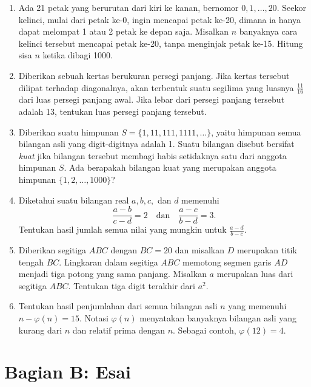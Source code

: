 \documentclass[11pt, a4paper]{article}
\begin{document}
\begin{enumerate}[label=\textbf{No. \arabic*}, leftmargin=*]
    \item Ada 21 petak yang berurutan dari kiri ke kanan, bernomor $0, 1, \dots, 20$. Seekor kelinci, mulai dari petak ke-0, ingin mencapai petak ke-20, dimana ia hanya dapat melompat 1 atau 2 petak ke depan saja. Misalkan $n$ banyaknya cara kelinci tersebut mencapai petak ke-20, tanpa menginjak petak ke-15. Hitung sisa $n$ ketika dibagi 1000.

    \item Diberikan sebuah kertas berukuran persegi panjang. Jika kertas tersebut dilipat terhadap diagonalnya, akan terbentuk suatu segilima yang luasnya $\frac{11}{16}$ dari luas persegi panjang awal. Jika lebar dari persegi panjang tersebut adalah 13, tentukan luas persegi panjang tersebut.

    \item Diberikan suatu himpunan $S = \{1, 11, 111, 1111, \dots\}$, yaitu himpunan semua bilangan asli yang digit-digitnya adalah 1. Suatu bilangan disebut bersifat \textit{kuat} jika bilangan tersebut membagi habis setidaknya satu dari anggota himpunan $S$. Ada berapakah bilangan kuat yang merupakan anggota himpunan $\{1, 2, \dots, 1000\}$?

    \item Diketahui suatu bilangan real $a, b, c,$ dan $d$ memenuhi
    \[ \frac{a - b}{c - d} = 2 \quad \text{dan} \quad \frac{a - c}{b - d} = 3. \]
    Tentukan hasil jumlah semua nilai yang mungkin untuk $\frac{a - d}{b - c}$.

    \item Diberikan segitiga $ABC$ dengan $BC = 20$ dan misalkan $D$ merupakan titik tengah $BC$. Lingkaran dalam segitiga $ABC$ memotong segmen garis $AD$ menjadi tiga potong yang sama panjang. Misalkan $a$ merupakan luas dari segitiga $ABC$. Tentukan tiga digit terakhir dari $a^2$.

    \item Tentukan hasil penjumlahan dari semua bilangan asli $n$ yang memenuhi $n - \varphi(n) = 15$. Notasi $\varphi(n)$ menyatakan banyaknya bilangan asli yang kurang dari $n$ dan relatif prima dengan $n$. Sebagai contoh, $\varphi(12) = 4$.
\end{enumerate}

\section*{Bagian B: Esai}
\end{document}
